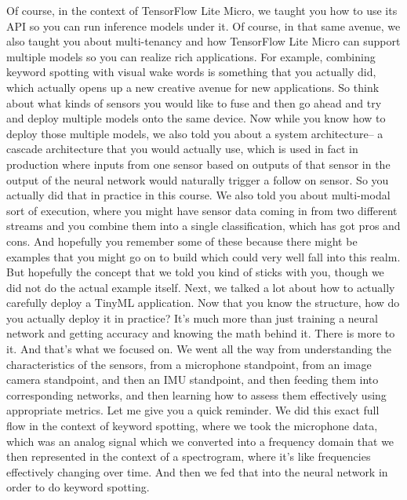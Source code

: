     Of course, in the context of TensorFlow Lite Micro,
    we taught you how to use its API so you can run inference models under it.
    Of course, in that same avenue, we also taught you about multi-tenancy
    and how TensorFlow Lite Micro can support multiple models
    so you can realize rich applications.
    For example, combining keyword spotting with visual wake words
    is something that you actually did, which
    actually opens up a new creative avenue for new applications.
    So think about what kinds of sensors you would like to fuse
    and then go ahead and try and deploy multiple models onto the same device.
    Now while you know how to deploy those multiple models,
    we also told you about a system architecture-- a cascade architecture
    that you would actually use, which is used in fact in production
    where inputs from one sensor based on outputs
    of that sensor in the output of the neural network
    would naturally trigger a follow on sensor.
    So you actually did that in practice in this course.
    We also told you about multi-modal sort of execution,
    where you might have sensor data coming in from two different streams
    and you combine them into a single classification, which
    has got pros and cons.
    And hopefully you remember some of these because there might be examples
    that you might go on to build which could very well fall into this realm.
    But hopefully the concept that we told you kind of
    sticks with you, though we did not do the actual example itself.
    Next, we talked a lot about how to actually
    carefully deploy a TinyML application.
    Now that you know the structure, how do you actually deploy it in practice?
    It's much more than just training a neural network
    and getting accuracy and knowing the math behind it.
    There is more to it.
    And that's what we focused on.
    We went all the way from understanding the characteristics
    of the sensors, from a microphone standpoint,
    from an image camera standpoint, and then an IMU standpoint,
    and then feeding them into corresponding networks,
    and then learning how to assess them effectively using appropriate metrics.
    Let me give you a quick reminder.
    We did this exact full flow in the context of keyword spotting,
    where we took the microphone data, which was an analog signal which we converted
    into a frequency domain that we then represented
    in the context of a spectrogram, where it's like frequencies effectively
    changing over time.
    And then we fed that into the neural network
    in order to do keyword spotting.
